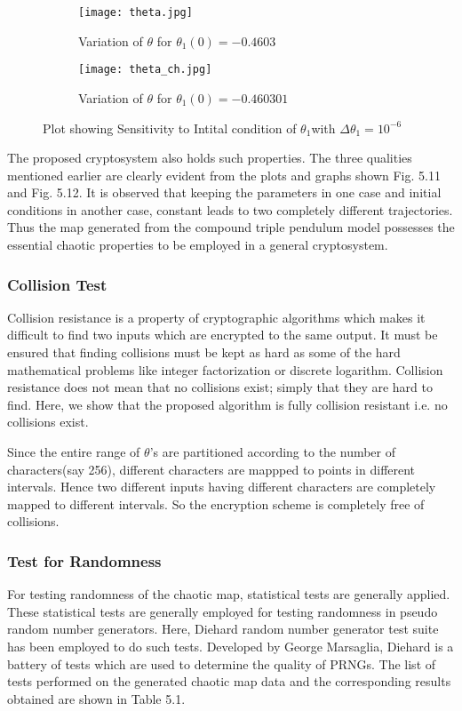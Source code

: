 \begin{figure}[H]
\begin{subfigure}{0.5\textwidth}
\texttt{[image: theta.jpg]}
\caption{Variation of ${\theta}$ for ${\theta_{1}(0)=-0.4603}$}\label{fig:theta_comp}
\end{subfigure}
\begin{subfigure}{0.5\textwidth}
\texttt{[image: theta\_ch.jpg]}
\caption{Variation of ${\theta}$ for ${\theta_{1}(0)=-0.460301}$}\label{fig:theta_ch_comp}
\end{subfigure}
\caption{Plot showing Sensitivity to Intital condition of ${\theta_{1}}$with ${\Delta \theta_{1} = 10^{-6}}$}\label{fig:image7}
\end{figure}

The proposed cryptosystem also holds such properties. The three qualities mentioned earlier are clearly evident from the plots and graphs shown Fig. 5.11 and Fig. 5.12. It is observed that keeping the parameters in one case and initial conditions in another case, constant leads to two completely different trajectories. Thus the map generated from the compound triple pendulum model possesses the essential chaotic properties to be employed in a general cryptosystem. 

\subsubsection{Collision Test}
Collision resistance is a property of cryptographic algorithms which makes it difficult to find two inputs which are encrypted to the same output. It must be ensured that finding collisions must be kept as hard as some of the hard mathematical problems like integer factorization  or discrete logarithm. Collision resistance does not mean that no collisions exist; simply that they are hard to find. Here, we show that the proposed algorithm is fully collision resistant i.e. no collisions exist.

Since the entire range of $\theta$'s are partitioned according to the number of characters(say 256), different characters are mappped to points in different intervals. Hence two different inputs having different characters are completely mapped to different intervals. So the encryption scheme is completely free of collisions. 

\subsubsection{Test for Randomness}
For testing randomness of the chaotic map, statistical tests are generally applied. These statistical tests are generally employed for testing randomness in pseudo random number generators. Here, Diehard random number generator test suite has been employed to do such tests. Developed by George Marsaglia, Diehard is a battery of tests which are used to determine the quality of PRNGs. The list of tests performed on the generated chaotic map data and the corresponding results obtained are shown in Table 5.1.


